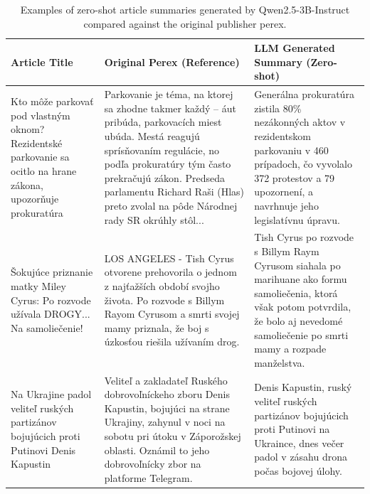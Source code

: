 \documentclass[11pt,a4paper]{article}
\begin{document}
\begin{table}[H]
	\centering
	\scriptsize
	\begin{tabular}{@{} >{\raggedright\arraybackslash}p{3.5cm} >{\raggedright\arraybackslash}p{5.5cm} >{\raggedright\arraybackslash}p{5.5cm} @{}}
		\toprule
		\textbf{Article Title}                                                                                         & \textbf{Original Perex (Reference)}                                                                                                                                                                                                                                               & \textbf{LLM Generated Summary (Zero-shot)}                                                                                                                                                \\ \midrule
		Kto môže parkovať pod vlastným oknom? Rezidentské parkovanie sa ocitlo na hrane zákona, upozorňuje prokuratúra & Parkovanie je téma, na ktorej sa zhodne takmer každý – áut pribúda, parkovacích miest ubúda. Mestá reagujú sprísňovaním regulácie, no podľa prokuratúry tým často prekračujú zákon. Predseda parlamentu Richard Raši (Hlas) preto zvolal na pôde Národnej rady SR okrúhly stôl... & Generálna prokuratúra zistila 80\% nezákonných aktov v rezidentskom parkovaniu v 460 prípadoch, čo vyvolalo 372 protestov a 79 upozornení, a navrhnuje jeho legislatívnu úpravu.          \\ \midrule
		Šokujúce priznanie matky Miley Cyrus: Po rozvode užívala DROGY... Na samoliečenie!                             & LOS ANGELES - Tish Cyrus otvorene prehovorila o jednom z najťažších období svojho života. Po rozvode s Billym Rayom Cyrusom a smrti svojej mamy priznala, že boj s úzkosťou riešila užívaním drog.                                                                                & Tish Cyrus po rozvode s Billym Raym Cyrusom siahala po marihuane ako formu samoliečenia, ktorá však potom potvrdila, že bolo aj nevedomé samoliečenie po smrti mamy a rozpade manželstva. \\ \midrule
		Na Ukrajine padol veliteľ ruských partizánov bojujúcich proti Putinovi Denis Kapustin                          & Veliteľ a zakladateľ Ruského dobrovoľníckeho zboru Denis Kapustin, bojujúci na strane Ukrajiny, zahynul v noci na sobotu pri útoku v Záporožskej oblasti. Oznámil to jeho dobrovoľnícky zbor na platforme Telegram.                                                               & Denis Kapustin, ruský veliteľ ruských partizánov bojujúcich proti Putinovi na Ukraince, dnes večer padol v zásahu drona počas bojovej úlohy.                                              \\ \bottomrule
	\end{tabular}
	\caption{Examples of zero-shot article summaries generated by Qwen2.5-3B-Instruct \cite{Yang2024} compared against the original publisher perex.}
	\label{tab:generated_article_summaries}
\end{table}
\end{document}
